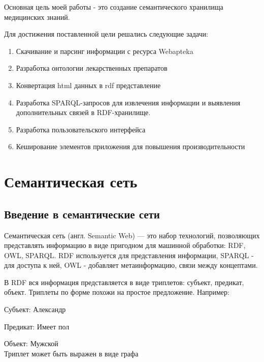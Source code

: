 \documentclass[specialist,subf,href,colorlinks=true
]{disser}
\begin{document}
Основная цель моей работы - это создание семантического хранилища медицинских знаний.

Для достижения поставленной цели решались следующие задачи:
\begin{enumerate}
\item Скачивание и парсинг информации с ресурса Webapteka
\item Разработка онтологии лекарственных препаратов
\item Конвертация html данных в rdf представление
\item Разработка SPARQL-запросов для извлечения информации и выявления дополнительных связей в RDF-хранилище.
\item Разработка пользовательского интерфейса
\item Кеширование элементов приложения для повышения производительности
\end{enumerate}

\chapter{Семантическая сеть}
\section{Введение в семантические сети}

Семантическая сеть (англ. Semantic Web) — это набор технологий, позволяющих представлять информацию в виде пригодном для машинной обработки: RDF, OWL, SPARQL. RDF используется для представления информации, SPARQL - для доступа к ней, OWL - добавляет метаинформацию, связи между концептами.

В RDF вся информация представляется в виде триплетов: субъект, предикат, объект. Триплеты по форме похожи на простое предложение.  Например:
\par Субъект: Александр
\par Предикат: Имеет пол
\par Объект: Мужской
\\Триплет может быть выражен в виде графа
\\
\par {}
\end{document}
